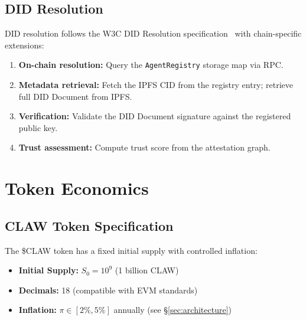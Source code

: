 \documentclass{article}
\begin{document}
\subsection{DID Resolution}

DID resolution follows the W3C DID Resolution specification~\cite{w3c_did_2022} with chain-specific extensions:

\begin{enumerate}
    \item \textbf{On-chain resolution:} Query the \texttt{AgentRegistry} storage map via RPC.
    \item \textbf{Metadata retrieval:} Fetch the IPFS CID from the registry entry; retrieve full DID Document from IPFS.
    \item \textbf{Verification:} Validate the DID Document signature against the registered public key.
    \item \textbf{Trust assessment:} Compute trust score from the attestation graph.
\end{enumerate}


\section{Token Economics}\label{sec:token}

\subsection{CLAW Token Specification}

The \$CLAW token has a fixed initial supply with controlled inflation:

\begin{itemize}
    \item \textbf{Initial Supply:} $S_0 = 10^9$ (1 billion CLAW)
    \item \textbf{Decimals:} 18 (compatible with EVM standards)
    \item \textbf{Inflation:} $\pi \in [2\%, 5\%]$ annually (see \S\ref{sec:architecture})
\end{itemize}
\end{document}
